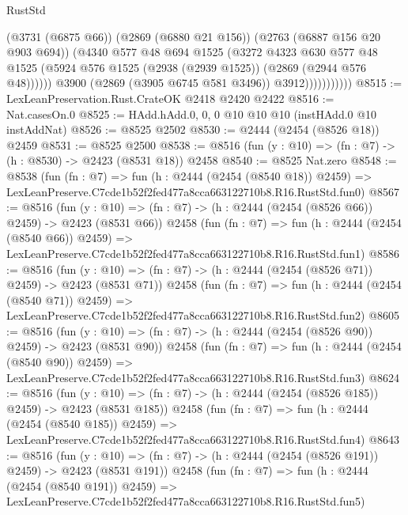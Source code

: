 \begin{lexlean}{RustStd}
\begin{coremodule}
                            (@3731 (@6875 @66))
                            (@2869 (@6880 @21 @156))
                            (@2763 (@6887 @156 @20 @903 @694))
                            (@4340
                              @577
                              @48
                              @694
                              @1525
                              (@3272
                                @4323
                                @630
                                @577
                                @48
                                @1525
                                (@5924 @576 @1525 (@2938 (@2939 @1525)) (@2869 (@2944 @576 @48))))))
                          @3900
                          (@2869 (@3905 @6745 @581 @3496))
                          @3912)))))))))))
@8515 := LexLeanPreservation.Rust.CrateOK @2418 @2420 @2422
@8516 := Nat.casesOn.{0}
@8525 := HAdd.hAdd.{0, 0, 0} @10 @10 @10 (instHAdd.{0} @10 instAddNat)
@8526 := @8525 @2502
@8530 := @2444 (@2454 (@8526 @18)) @2459
@8531 := @8525 @2500
@8538 := @8516 (fun (y : @10) => (fn : @7) -> (h : @8530) -> @2423 (@8531 @18)) @2458
@8540 := @8525 Nat.zero
@8548 := @8538
    (fun (fn : @7) =>
    fun (h : @2444 (@2454 (@8540 @18)) @2459) =>
    LexLeanPreserve.C7cde1b52f2fed477a8cca663122710b8.R16.RustStd.fun0)
@8567 := @8516
    (fun (y : @10) => (fn : @7) -> (h : @2444 (@2454 (@8526 @66)) @2459) -> @2423 (@8531 @66))
    @2458
    (fun (fn : @7) =>
    fun (h : @2444 (@2454 (@8540 @66)) @2459) =>
    LexLeanPreserve.C7cde1b52f2fed477a8cca663122710b8.R16.RustStd.fun1)
@8586 := @8516
    (fun (y : @10) => (fn : @7) -> (h : @2444 (@2454 (@8526 @71)) @2459) -> @2423 (@8531 @71))
    @2458
    (fun (fn : @7) =>
    fun (h : @2444 (@2454 (@8540 @71)) @2459) =>
    LexLeanPreserve.C7cde1b52f2fed477a8cca663122710b8.R16.RustStd.fun2)
@8605 := @8516
    (fun (y : @10) => (fn : @7) -> (h : @2444 (@2454 (@8526 @90)) @2459) -> @2423 (@8531 @90))
    @2458
    (fun (fn : @7) =>
    fun (h : @2444 (@2454 (@8540 @90)) @2459) =>
    LexLeanPreserve.C7cde1b52f2fed477a8cca663122710b8.R16.RustStd.fun3)
@8624 := @8516
    (fun (y : @10) => (fn : @7) -> (h : @2444 (@2454 (@8526 @185)) @2459) -> @2423 (@8531 @185))
    @2458
    (fun (fn : @7) =>
    fun (h : @2444 (@2454 (@8540 @185)) @2459) =>
    LexLeanPreserve.C7cde1b52f2fed477a8cca663122710b8.R16.RustStd.fun4)
@8643 := @8516
    (fun (y : @10) => (fn : @7) -> (h : @2444 (@2454 (@8526 @191)) @2459) -> @2423 (@8531 @191))
    @2458
    (fun (fn : @7) =>
    fun (h : @2444 (@2454 (@8540 @191)) @2459) =>
    LexLeanPreserve.C7cde1b52f2fed477a8cca663122710b8.R16.RustStd.fun5)

\end{coremodule}
\end{lexlean}
